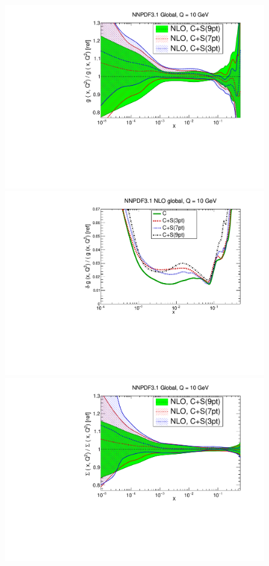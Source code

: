 \begin{figure}[H]
  \begin{center}
    \includegraphics[scale=0.35]{mhous/plots/xg-Global-NLO-CovMatTH-prescriptions.pdf}
    \includegraphics[scale=0.35]{mhous/plots/xg-ERR-Global-NLO-CovMatTH-prescriptions-uncertainties.pdf}
    \includegraphics[scale=0.35]{mhous/plots/xsinglet-Global-NLO-CovMatTH-prescriptions.pdf}

\end{center}
\end{figure}
